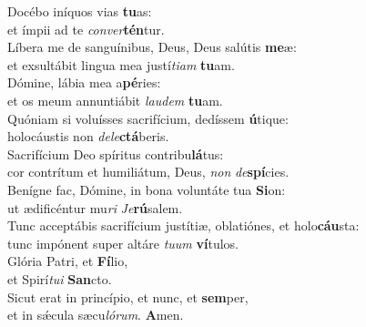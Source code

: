 \evenverse Docébo iníquos vias \textbf{tu}as:~\*\\
\evenverse et ímpii ad te \textit{con}\textit{ver}\textbf{tén}tur.\\
\oddverse Líbera me de sanguínibus, Deus, Deus salútis \textbf{me}æ:~\*\\
\oddverse et exsultábit lingua mea justí\textit{ti}\textit{am} \textbf{tu}am.\\
\evenverse Dómine, lábia mea a\textbf{pé}ries:~\*\\
\evenverse et os meum annuntiábit \textit{lau}\textit{dem} \textbf{tu}am.\\
\oddverse Quóniam si voluísses sacrifícium, dedíssem \textbf{ú}tique:~\*\\
\oddverse holocáustis non \textit{de}\textit{le}\textbf{ctá}beris.\\
\evenverse Sacrifícium Deo spíritus contribu\textbf{lá}tus:~\*\\
\evenverse cor contrítum et humiliátum, Deus, \textit{non} \textit{de}\textbf{spí}cies.\\
\oddverse Benígne fac, Dómine, in bona voluntáte tua \textbf{Si}on:~\*\\
\oddverse ut ædificéntur mu\textit{ri} \textit{Je}\textbf{rú}salem.\\
\evenverse Tunc acceptábis sacrifícium justítiæ, oblatiónes, et holo\textbf{cáu}sta:~\*\\
\evenverse tunc impónent super altáre \textit{tu}\textit{um} \textbf{ví}tulos.\\
\oddverse Glória Patri, et \textbf{Fí}lio,~\*\\
\oddverse et Spirí\textit{tu}\textit{i} \textbf{San}cto.\\
\evenverse Sicut erat in princípio, et nunc, et \textbf{sem}per,~\*\\
\evenverse et in sǽcula sæcu\textit{ló}\textit{rum}. \textbf{A}men.\\
